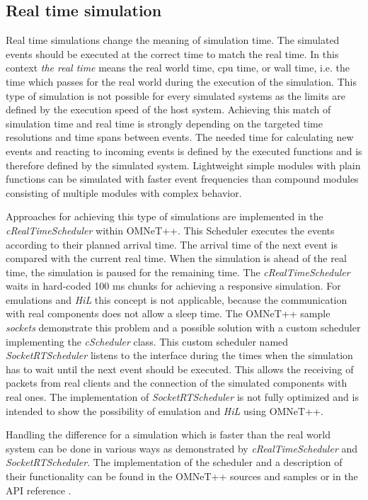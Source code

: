 \documentclass[journal]{IEEEtran}
\begin{document}
\subsection{Real time simulation}
\label{sec:RealTimeSimulation}
Real time simulations change the meaning of simulation time.
The simulated events should be executed at the correct time to match the real time.
In this context \emph{the real time} means the real world time, cpu time, or wall time, i.e. the time which passes for the real world during the execution of the simulation.
This type of simulation is not possible for every simulated systems as the limits are defined by the execution speed of the host system.
Achieving this match of simulation time and real time is strongly depending on the targeted time resolutions and time spans between events.
The needed time for calculating new events and reacting to incoming events is defined by the executed functions and is therefore defined by the simulated system.
Lightweight simple modules with plain functions can be simulated with faster event frequencies than compound modules consisting of multiple modules with complex behavior.

Approaches for achieving this type of simulations are implemented in the \emph{cRealTimeScheduler} within OMNeT++.
This Scheduler executes the events according to their planned arrival time.
The arrival time of the next event is compared with the current real time.
When the simulation is ahead of the real time, the simulation is paused for the remaining time.
The \emph{cRealTimeScheduler} waits in hard-coded 100 ms chunks for achieving a responsive simulation.
For emulations and \emph{HiL} this concept is not applicable, because the communication with real components does not allow a sleep time.
The OMNeT++ sample \emph{sockets} demonstrate this problem and a possible solution with a custom scheduler implementing the \emph{cScheduler} class.
This custom scheduler named \emph{SocketRTScheduler} listens to the interface during the times when the simulation has to wait until the next event should be executed.
This allows the receiving of packets from real clients and the connection of the simulated components with real ones.
The implementation of \emph{SocketRTScheduler} is not fully optimized and is intended to show the possibility of emulation and \emph{HiL} using OMNeT++.

Handling the difference for a simulation which is faster than the real world system can be done in various ways as demonstrated by \emph{cRealTimeScheduler} and \emph{SocketRTScheduler}.
The implementation of the scheduler and a description of their functionality can be found in the OMNeT++ sources and samples or in the API reference \cite[]{OMNETAPIREF}.
\end{document}
